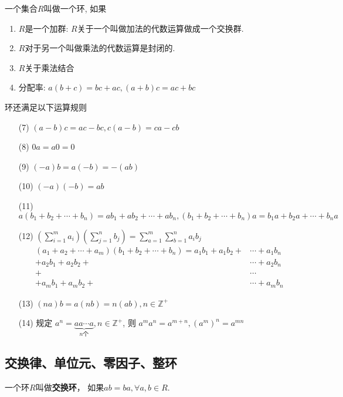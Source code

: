 \begin{Definition}[环]
一个集合$R$叫做一个环, 如果
\begin{enumerate}
	\item $R$是一个加群: $R$关于一个叫做加法的代数运算做成一个交换群.
	\item $R$对于另一个叫做乘法的代数运算是封闭的.
	\item $R$关于乘法结合
	\item 分配率: $a(b+c) = bc + ac, (a+b)c = ac + bc$
\end{enumerate}
\end{Definition}

\begin{Theorem}
环还满足以下运算规则
\begin{enumerate}[(1)]
\item[(7)] $(a-b)c = ac - bc, c(a - b) = ca - cb$
\item[(8)] $\mathfrak{0}a = a\mathfrak{0} = \mathfrak{0}$
\item[(9)] $(-a)b = a(-b) = -(ab)$
\item[(10)] $(-a)(-b) = ab$
\item[(11)] $a(b_1 + b_2 + \cdots + b_n) = ab_1 +ab_2 + \cdots + ab_n, (b_1 + b_2 + \cdots + b_n)a = b_1a + b_2a + \cdots + b_na$
\item[(12)] 
$ \displaystyle \left( \sum_{i=1}^m a_i \right) \left( \sum_{j=1}^n b_j \right) 
= \sum_{a=1}^m \sum_{b=1}^{n} a_i b_j $
           $$
\begin{aligned}
(a_1 + a_2 + \cdots + a_m) (b_1 + b_2 + \cdots + b_n) 
= 
a_1b_1 + a_1 b_2 + &\cdots + a_1 b_n \\
+ a_2 b_1 + a_2 b_2 + &\cdots + a_2 b_n \\
+ &\cdots \\
+ a_m b_1 + a_m b_2 + &\cdots + a_m b_n
\end{aligned}
 $$
 \item[(13)] $ (na)b = a(nb) = n(ab), n \in \mathbb{Z}^+$ 
 \item[(14)] 规定 $a^n = \underbrace{a a \cdots a}_{n\text{个}}, n \in \mathbb{Z}^{+}$, 则 $ a^m a^n = a^{m+n}, (a^m)^n = a^{mn} $
\end{enumerate}
\end{Theorem}

\subsection{交换律、单位元、零因子、整环}

\begin{Definition}[交换环]
一个环$R$叫做\textbf{交换环}， 如果$ab = ba,  \forall a, b \in R$.
\end{Definition}

